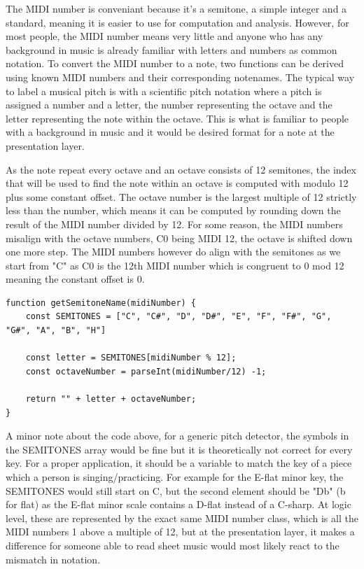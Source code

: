 The MIDI number is conveniant because it's a semitone, a simple integer and a standard, meaning it is easier to use for computation and analysis. However, for most people, the MIDI number means very little and anyone who has any background in music is already familiar with letters and numbers as common notation. To convert the MIDI number to a note, two functions can be derived using known MIDI numbers and their corresponding notenames. The typical way to label a musical pitch is with a scientific pitch notation where a pitch is assigned a number and a letter, the number representing the octave and the letter representing the note within the octave. This is what is familiar to people with a background in music and it would be desired format for a note at the presentation layer.

As the note repeat every octave and an octave consists of 12 semitones, the index that will be used to find the note within an octave is computed with modulo 12 plus some constant offset. The octave number is the largest multiple of 12 strictly less than the number, which means it can be computed by rounding down the result of the MIDI number divided by 12. For some reason, the MIDI numbers misalign with the octave numbers, C0 being MIDI 12, the octave is shifted down one more step. The MIDI numbers however do align with the semitones as we start from "C" as C0 is the 12th MIDI number which is congruent to 0 mod 12 meaning the constant offset is 0.
\begin{lstlisting}[style=javascript]
function getSemitoneName(midiNumber) {
    const SEMITONES = ["C", "C#", "D", "D#", "E", "F", "F#", "G", "G#", "A", "B", "H"]

    const letter = SEMITONES[midiNumber % 12];
    const octaveNumber = parseInt(midiNumber/12) -1;

    return "" + letter + octaveNumber; 
}
\end{lstlisting}
A minor note about the code above, for a generic pitch detector, the symbols in the SEMITONES array would be fine but it is theoretically not correct for every key. For a proper application, it should be a variable to match the key of a piece which a person is singing/practicing. For example for the E-flat minor key, the SEMITONES would still start on C, but the second element should be "Db" (b for flat) as the E-flat minor scale contains a D-flat instead of a C-sharp. At logic level, these are represented by the exact same MIDI number class, which is all the MIDI numbers 1 above a multiple of 12, but at the presentation layer, it makes a difference for someone able to read sheet music would most likely react to the mismatch in notation.

